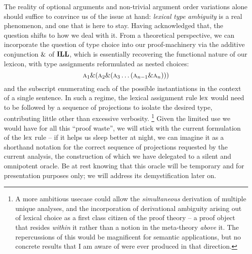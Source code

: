 The reality of optional arguments and non-trivial argument order variations alone should suffice to convince us of the issue at hand: \textit{lexical type ambiguity} is a real phenomenon, and one that is here to stay.
Having acknowledged that, the question shifts to how we deal with it.
From a theoretical perspective, we can incorporate the question of type choice into our proof-machinery via the additive conjunction ${\&}$ of $\textbf{ILL}$, which is essentially recovering the functional nature of our lexicon, with type assignments reformulated as nested choices:
\begin{equation}
 \normalfont\textsc{a}_1 {\&} (\normalfont\textsc{a}_2 {\&} (\normalfont\textsc{a}_3 \dots (\normalfont\textsc{a}_{n-1}{\&}\normalfont\textsc{a}_{n})))
\end{equation}
and the subscript enumerating each of the possible instantiations in the context of a single sentence.
In such a regime, the lexical assignment rule $\mathrm{lex}$ would need to be followed by a sequence of projections to isolate the desired type, contributing little other than excessive verbosity.%
\footnote{
A more ambitious usecase could allow the \textit{simultaneous} derivation of multiple unique analyses, and the incorporation of derivational ambiguity arising out of lexical choice as a first class citizen of the proof theory -- a proof object that resides \textit{within} it rather than a notion in the meta-theory \textit{above} it.
The repercussions of this would be magnificent for semantic applications, but no concrete results that I am aware of were ever produced in that direction.}
Given the limited use we would have for all this ``proof waste'', we will stick with the current formulation of the $\mathrm{lex}$ rule -- if it helps us sleep better at night, we can imagine it as a shorthand notation for the correct sequence of projections requested by the current analysis, the construction of which we have delegated to a silent and omnipotent oracle.
Be at rest knowing that this oracle will be temporary and for presentation purposes only; we will address its demystification later on.

